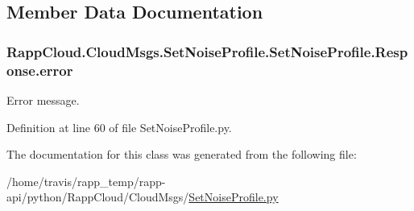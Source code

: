 \subsection{Member Data Documentation}
\hypertarget{classRappCloud_1_1CloudMsgs_1_1SetNoiseProfile_1_1SetNoiseProfile_1_1Response_a3a1aacd54eed4e0a6c0b4fc1ef6e7247}{
\subsubsection[{error}]{\setlength{\rightskip}{0pt plus 5cm}Rapp\-Cloud.\-Cloud\-Msgs.\-Set\-Noise\-Profile.\-Set\-Noise\-Profile.\-Response.\-error}}\label{classRappCloud_1_1CloudMsgs_1_1SetNoiseProfile_1_1SetNoiseProfile_1_1Response_a3a1aacd54eed4e0a6c0b4fc1ef6e7247}


Error message. 



Definition at line 60 of file Set\-Noise\-Profile.\-py.



The documentation for this class was generated from the following file\-:\begin{DoxyCompactItemize}
\item 
/home/travis/rapp\-\_\-temp/rapp-\/api/python/\-Rapp\-Cloud/\-Cloud\-Msgs/\hyperlink{SetNoiseProfile_8py}{Set\-Noise\-Profile.\-py}\end{DoxyCompactItemize}
